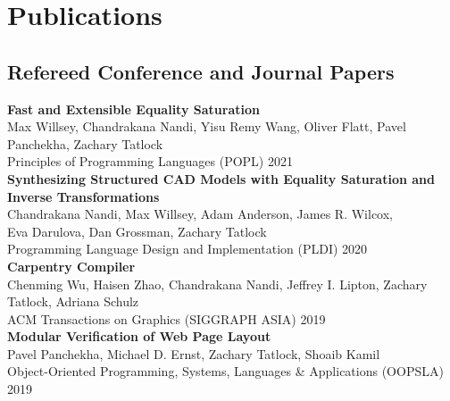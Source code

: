 \documentclass[10pt]{article}
\begin{document}





\section*{Publications}

\subsection*{Refereed Conference and Journal Papers}

\textbf{%
  Fast and Extensible Equality Saturation
} \\
Max Willsey, Chandrakana Nandi, Yisu Remy Wang, Oliver Flatt, Pavel Panchekha, Zachary Tatlock \\
Principles of Programming Languages (POPL) 2021 \\

\textbf{%
Synthesizing Structured CAD Models with
Equality Saturation and Inverse Transformations
} \\
Chandrakana Nandi, Max Willsey, Adam Anderson, James R. Wilcox, \\
Eva Darulova, Dan Grossman, Zachary Tatlock \\
Programming Language Design and Implementation (PLDI) 2020 \\

\textbf{%
Carpentry Compiler
} \\
Chenming Wu, Haisen Zhao, Chandrakana Nandi, Jeffrey I. Lipton, Zachary Tatlock, Adriana Schulz \\
ACM Transactions on Graphics (SIGGRAPH ASIA) 2019 \\

\textbf{%
Modular Verification of Web Page Layout
} \\
Pavel Panchekha, Michael D. Ernst, Zachary Tatlock, Shoaib Kamil \\
Object-Oriented Programming, Systems, Languages \& Applications (OOPSLA) 2019 \\
\end{document}
